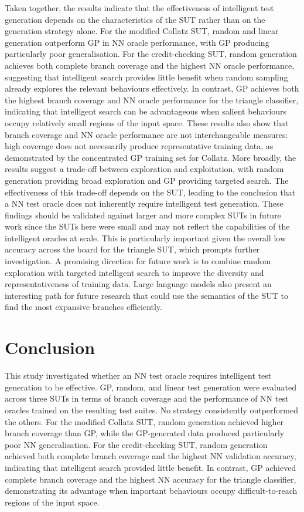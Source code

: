 \documentclass[runningheads]{llncs}
\begin{document}
Taken together, the results indicate that the effectiveness of intelligent test generation depends on the characteristics of the SUT rather than on the generation strategy alone. For the modified Collatz SUT, random and linear generation outperform GP in NN oracle performance, with GP producing particularly poor generalisation. For the credit-checking SUT, random generation achieves both complete branch coverage and the highest NN oracle performance, suggesting that intelligent search provides little benefit when random sampling already explores the relevant behaviours effectively. In contrast, GP achieves both the highest branch coverage and NN oracle performance for the triangle classifier, indicating that intelligent search can be advantageous when salient behaviours occupy relatively small regions of the input space. These results also show that branch coverage and NN oracle performance are not interchangeable measures: high coverage does not necessarily produce representative training data, as demonstrated by the concentrated GP training set for Collatz. More broadly, the results suggest a trade-off between exploration and exploitation, with random generation providing broad exploration and GP providing targeted search. The effectiveness of this trade-off depends on the SUT, leading to the conclusion that a NN test oracle does not inherently require intelligent test generation. These findings should be validated against larger and more complex SUTs in future work since the SUTs here were small and may not reflect the capabilities of the intelligent oracles at scale. This is particularly important given the overall low accuracy across the board for the triangle SUT, which prompts further investigation. A promising direction for future work is to combine random exploration with targeted intelligent search to improve the diversity and representativeness of training data. Large language models also present an interesting path for future research that could use the semantics of the SUT to find the most expansive branches efficiently.

\section{Conclusion} \label{sec:conc}
This study investigated whether an NN test oracle requires intelligent test generation to be effective. GP, random, and linear test generation were evaluated across three SUTs in terms of branch coverage and the performance of NN test oracles trained on the resulting test suites. No strategy consistently outperformed the others. For the modified Collatz SUT, random generation achieved higher branch coverage than GP, while the GP-generated data produced particularly poor NN generalisation. For the credit-checking SUT, random generation achieved both complete branch coverage and the highest NN validation accuracy, indicating that intelligent search provided little benefit. In contrast, GP achieved complete branch coverage and the highest NN accuracy for the triangle classifier, demonstrating its advantage when important behaviours occupy difficult-to-reach regions of the input space.
\end{document}
